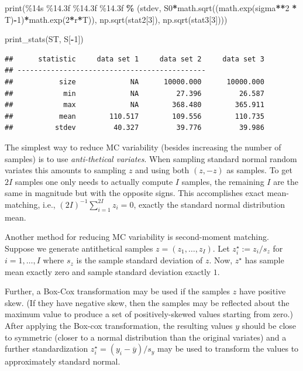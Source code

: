 \documentclass[
]{book}
\newenvironment{Shaded}{\begin{snugshade}}{\end{snugshade}}
\newcommand{\BuiltInTok}[1]{#1}
\newcommand{\DecValTok}[1]{\textcolor[rgb]{0.00,0.00,0.81}{#1}}
\newcommand{\NormalTok}[1]{#1}
\newcommand{\OperatorTok}[1]{\textcolor[rgb]{0.81,0.36,0.00}{\textbf{#1}}}
\newcommand{\SpecialCharTok}[1]{\textcolor[rgb]{0.00,0.00,0.00}{#1}}
\newcommand{\StringTok}[1]{\textcolor[rgb]{0.31,0.60,0.02}{#1}}
\begin{document}
\begin{Shaded}
\begin{Highlighting}[]
    \BuiltInTok{print}\NormalTok{(}\StringTok{\textquotesingle{}}\SpecialCharTok{\%14s}\StringTok{ }\SpecialCharTok{\%14.3f}\StringTok{ }\SpecialCharTok{\%14.3f}\StringTok{ }\SpecialCharTok{\%14.3f}\StringTok{\textquotesingle{}} \OperatorTok{\%}\NormalTok{ (}\StringTok{\textquotesingle{}stdev\textquotesingle{}}\NormalTok{, S0}\OperatorTok{*}\NormalTok{math.sqrt((math.exp(sigma}\OperatorTok{**}\DecValTok{2} \OperatorTok{*}\NormalTok{ T)}\OperatorTok{{-}}\DecValTok{1}\NormalTok{)}\OperatorTok{*}\NormalTok{math.exp(}\DecValTok{2}\OperatorTok{*}\NormalTok{r}\OperatorTok{*}\NormalTok{T)), np.sqrt(stat2[}\DecValTok{3}\NormalTok{]), np.sqrt(stat3[}\DecValTok{3}\NormalTok{])))}


\NormalTok{print\_stats(ST, S[}\OperatorTok{{-}}\DecValTok{1}\NormalTok{])}
\end{Highlighting}
\end{Shaded}

\begin{verbatim}
##      statistic     data set 1     data set 2     data set 3
## ---------------------------------------------
##           size             NA      10000.000      10000.000
##            min             NA         27.396         26.587
##            max             NA        368.480        365.911
##           mean        110.517        109.556        110.735
##          stdev         40.327         39.776         39.986
\end{verbatim}

The simplest way to reduce MC variability (besides increasing the number of samples) is to use \emph{anti-thetical variates}. When sampling standard normal random variates this amounts to sampling \(z\) and using both \((z,-z)\) as samples. To get \(2I\) samples one only needs to actually compute \(I\) samples, the remaining \(I\) are the same in magnitude but with the opposite signs. This accomplishes exact mean-matching, i.e., \((2I)^{-1}\sum_{i=1}^{2I} z_i = 0\), exactly the standard normal distribution mean.

Another method for reducing MC variability is second-moment matching. Suppose we generate antithetical samples \(z = (z_1, \ldots, z_I)\). Let \(z^\star_i := z_i / s_{z}\) for \(i=1, \ldots, I\) where \(s_z\) is the sample standard deviation of \(z\). Now, \(z^\star\) has sample mean exactly zero and sample standard deviation exactly \(1\).

Further, a Box-Cox transformation may be used if the samples \(z\) have positive skew. (If they have negative skew, then the samples may be reflected about the maximum value to produce a set of positively-skewed values starting from zero.) After applying the Box-cox transformation, the resulting values \(y\) should be close to symmetric (closer to a normal distribution than the original variates) and a further standardization \(z^\star_i = (y_i - \overline y)/s_y\) may be used to transform the values to approximately standard normal.
\end{document}
